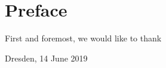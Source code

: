 \chapter*{Preface}


First and foremost, we would like to thank 

\vspace*{0.1cm}
\begin{flushright}
Dresden, 14 June 2019\\[0.1cm]
\vspace*{1cm}
\penulis

\end{flushright}